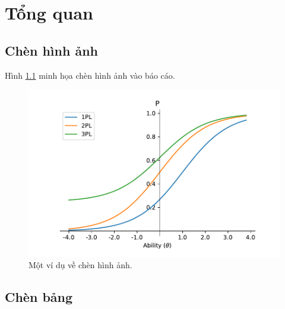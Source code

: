 \chapter{Tổng quan}\label{chapter_overview}


\section{Chèn hình ảnh}

Hình \ref{icc_plot} minh họa chèn hình ảnh vào báo cáo.
 
\begin{center}
    \begin{figure}[h!]
    \begin{center}
     \includegraphics[scale=0.5]{figs/ICC_plots.pdf}
    \end{center}
    \caption{Một ví dụ về chèn hình ảnh.}
    \label{icc_plot}
    \end{figure}
\end{center}

\section{Chèn bảng}

